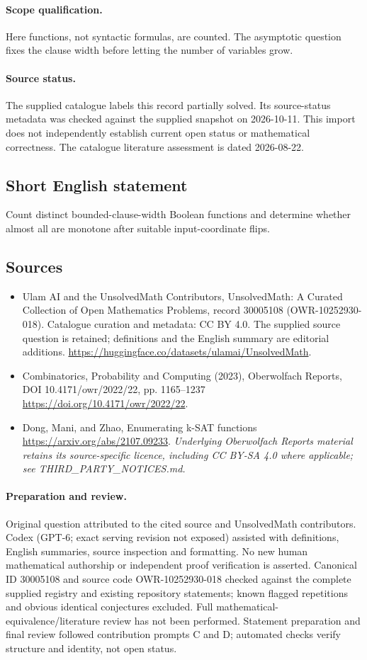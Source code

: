 \documentclass[11pt]{article}
\begin{document}
\paragraph{Scope qualification.}
Here functions, not syntactic formulas, are counted. The asymptotic question fixes the clause width before letting the number of variables grow.
\paragraph{Source status.}
The supplied catalogue labels this record partially solved. Its source-status metadata was checked against the supplied snapshot on 2026-10-11. This import does not independently establish current open status or mathematical correctness. The catalogue literature assessment is dated 2026-08-22.
\subsection{Short English statement}
Count distinct bounded-clause-width Boolean functions and determine whether almost all are monotone after suitable input-coordinate flips.
\subsection{Sources}
\begin{itemize}
\item[S1] Ulam AI and the UnsolvedMath Contributors, UnsolvedMath: A Curated Collection of Open Mathematics Problems, record 30005108 (OWR-10252930-018). Catalogue curation and metadata: CC BY 4.0. The supplied source question is retained; definitions and the English summary are editorial additions.
\url{https://huggingface.co/datasets/ulamai/UnsolvedMath}.
\item[S2] Combinatorics, Probability and Computing (2023), Oberwolfach Reports, DOI 10.4171/owr/2022/22, pp. 1165--1237
\url{https://doi.org/10.4171/owr/2022/22}.
\item[S3] Dong, Mani, and Zhao, Enumerating k-SAT functions
\url{https://arxiv.org/abs/2107.09233}.
\textit{Underlying Oberwolfach Reports material retains its source-specific licence, including CC BY-SA 4.0 where applicable; see THIRD\_PARTY\_NOTICES.md.}
\end{itemize}
\paragraph{Preparation and review.}
Original question attributed to the cited source and UnsolvedMath contributors. Codex (GPT-6; exact serving revision not exposed) assisted with definitions, English summaries, source inspection and formatting. No new human mathematical authorship or independent proof verification is asserted. Canonical ID 30005108 and source code OWR-10252930-018 checked against the complete supplied registry and existing repository statements; known flagged repetitions and obvious identical conjectures excluded. Full mathematical-equivalence/literature review has not been performed. Statement preparation and final review followed contribution prompts C and D; automated checks verify structure and identity, not open status.
\label{end:30005108}
\end{document}

